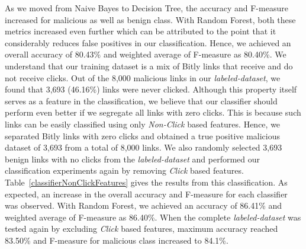 \documentclass[conference]{IEEEtran}
\begin{document}
As we moved from Naive Bayes to Decision Tree, the accuracy and F-measure increased for malicious as well as benign class. With Random Forest, both these metrics increased even further which can be attributed to the point that it considerably reduces false positives in our classification. Hence, we achieved an overall accuracy of 80.43\% and weighted average of F-measure as 80.40\%. 
We understand that our training dataset is a mix of Bitly links that receive and do not receive clicks. Out of the 8,000 malicious links in our \textit{labeled-dataset}, we found that 3,693 (46.16\%) links were never clicked. Although this property itself serves as a feature in the classification, we believe that our classifier should perform even better if we segregate all links with zero clicks. This is because such links can be easily classified using only \textit{Non-Click} based features. Hence, we separated Bitly links with zero clicks and obtained a true positive malicious dataset of 3,693 from a total of 8,000 links. We also randomly selected 3,693 benign links with no clicks from the \textit{labeled-dataset} and performed our classification experiments again by removing \textit{Click} based features. Table~\ref{classifierNonClickFeatures} gives the results from this classification. As expected, an increase in the overall accuracy and F-measure for each classifier was observed. With Random Forest, we achieved an accuracy of 86.41\% and weighted average of F-measure as 86.40\%. When the complete \textit{labeled-dataset} was tested again by excluding \textit{Click} based features, maximum accuracy reached 83.50\% and F-measure for malicious class increased to 84.1\%.
\end{document}
